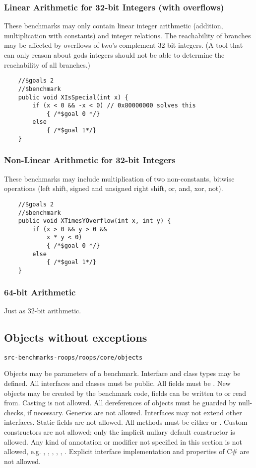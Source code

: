 \subsubsection{Linear Arithmetic for 32-bit Integers (with overflows)}

These benchmarks may only contain linear integer arithmetic (addition, multiplication with constants)
and integer relations. The reachability of branches may be affected by overflows of two's-complement 
32-bit integers. (A tool that can only reason about gods integers should not be able to 
determine the  reachability of all branches.)
\begin{verbatim}
    //$goals 2
    //$benchmark
    public void XIsSpecial(int x) {
        if (x < 0 && -x < 0) // 0x80000000 solves this
            { /*$goal 0 */}
        else
            { /*$goal 1*/}
    }
\end{verbatim}

\subsubsection{Non-Linear Arithmetic for 32-bit Integers}

These benchmarks may include multiplication of two non-constants,
bitwise operations (left shift, signed and unsigned right shift, or, and, xor, not).

\begin{verbatim}
    //$goals 2
    //$benchmark
    public void XTimesYOverflow(int x, int y) {
        if (x > 0 && y > 0 &&
            x * y < 0) 
            { /*$goal 0 */}
        else
            { /*$goal 1*/}
    }
\end{verbatim}

\subsubsection{64-bit Arithmetic}

Just as 32-bit arithmetic.

\subsection{Objects without exceptions}

\verb|src-benchmarks-roops/roops/core/objects|

Objects may be parameters of a benchmark. 
Interface and class types may be defined. 
All interfaces and classes must be public.
All fields must be .
New objects may be created by the benchmark code,
fields can be written to or read from.
Casting is not allowed.
All dereferences of objects must be guarded by null-checks,
if necessary.
Generics are not allowed.
Interfaces may not extend other interfaces.
Static fields are not allowed.
All methods must be either  or .
Custom constructors are not allowed; only the implicit nullary default constructor is allowed.
Any kind of annotation or modifier not specified in this section is not allowed,
e.g. , , , , , .
Explicit interface implementation and properties of C\# are not allowed.

